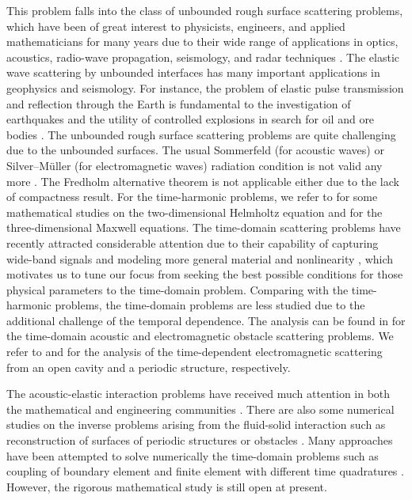 \documentclass[final,leqno]{siamltex}
\begin{document}
This problem falls into the class of unbounded rough surface scattering
problems, which have been of great interest to physicists, engineers, and
applied mathematicians for many years due to their wide range of applications in
optics, acoustics, radio-wave propagation, seismology, and radar techniques
\cite{Abubakar1962, Elfouhaily2004, Ogilvy191, Voronovich1998,
Warnick2001}. The elastic wave scattering by unbounded interfaces has many
important applications in geophysics and seismology. For instance, the problem
of elastic pulse transmission and reflection through the Earth is fundamental to
the investigation of earthquakes and the utility of controlled explosions in
search for oil and ore bodies \cite{fokkema1980reflection,
fokkema1977elastodynamic, sherwood1958elastic}. The unbounded rough
surface scattering problems are quite challenging due to the unbounded surfaces.
The usual Sommerfeld (for acoustic waves) or Silver--M\"{u}ller (for
electromagnetic waves) radiation condition is not valid any more
\cite{Arens2005, Zhang1998}. The Fredholm alternative theorem is not applicable
either due to the lack of compactness result. For the time-harmonic problems, we
refer to \cite{Chandler2006, Chandler2005, Chandler1999, Lechleiter2010,
LiShen2012} for some mathematical studies on the two-dimensional Helmholtz
equation and \cite{Haddar2011, LiWuZheng2011, LiZhengZheng2016} for the
three-dimensional Maxwell equations. The time-domain scattering problems have
recently attracted considerable attention due to their capability
of capturing wide-band signals and modeling more general material and
nonlinearity \cite{ChenMonk2014, jin2009finite, LiHuang2013, Riley2008,
Wang2012}, which motivates us to tune our focus from seeking the best possible
conditions for those physical parameters to the time-domain problem. Comparing
with the time-harmonic problems, the time-domain problems are less
studied due to the additional challenge of the temporal dependence.
The analysis can be found in \cite{Chen2008Maxwell, wang2014} for
the time-domain acoustic and electromagnetic obstacle scattering problems.
We refer to \cite{LiWangWood2015} and \cite{GaoLi2016} for the analysis of the
time-dependent electromagnetic scattering from an open cavity and a periodic
structure, respectively.

The acoustic-elastic interaction problems have received much attention in both
the mathematical and engineering communities
\cite{dallas1989, donea1982arbitrary, hamdi1986mixed, Hsiao1989, Hsiao1994,
LukeMartin1995}. There are also some numerical studies on the inverse problems
arising from the fluid-solid interaction such as reconstruction of surfaces of
periodic structures or obstacles \cite{HuKrish2016, TaoHu2016}. Many
approaches have been attempted to solve numerically the time-domain problems
such as coupling of boundary element and finite element with different time
quadratures \cite{estorff1991, soares2006dynamic, Flemisch2006}. However, the
rigorous mathematical study is still open at present.
\end{document}
